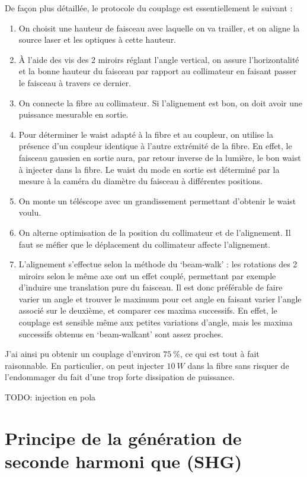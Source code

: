 \documentclass[11pt,a4paper] { article}
\begin{document}
De façon plus détaillée, le protocole du couplage est essentiellement le suivant :
\begin{enumerate}
	\item On choisit une hauteur de faisceau avec laquelle on va trailler, et on aligne la source laser et les optiques à cette hauteur.
	\item À l'aide des vis des 2 miroirs réglant l'angle vertical, on assure l'horizontalité et la bonne hauteur du faisceau par rapport au collimateur en faisant passer le faisceau à travers ce dernier.
	\item On connecte la fibre au collimateur. Si l'alignement est bon, on doit avoir une puissance mesurable en sortie.
	\item Pour déterminer le waist adapté à la fibre et au coupleur, on utilise la présence d'un coupleur identique à l'autre extrémité de la fibre. En effet, le faisceau gaussien en sortie aura, par retour inverse de la lumière, le bon waist à injecter dans la fibre. Le waist du mode en sortie est déterminé par la mesure à la caméra du diamètre du faisceau à différentes positions.	
	\item On monte un téléscope avec un grandissement permettant d'obtenir le waist voulu.
	\item On alterne optimisation de la position du collimateur et de l'alignement. Il faut se méfier que le déplacement du collimateur affecte l'alignement.
	\item L'alignement s'effectue selon la méthode du `beam-walk' : les rotations des 2 miroirs selon le même axe ont un effet couplé, permettant par exemple d'induire une translation pure du faisceau. Il est donc préférable de faire varier un angle et trouver le maximum pour cet angle en faisant varier l'angle associé sur le deuxième, et comparer ces maxima successifs. En effet, le couplage est sensible même aux petites variations d'angle, mais les maxima successifs obtenus en `beam-walkant' sont assez proches. 
\end{enumerate}

J'ai ainsi pu obtenir un couplage d'environ $\SI{75}{\percent}$, ce qui est tout à fait raisonnable. En particulier, on peut injecter $\SI{10}{W}$ dans la fibre sans risquer de l'endommager du fait d'une trop forte dissipation de puissance.

TODO: injection en pola


\section{Principe de la génération de seconde harmoni que (SHG)} %
\label{SHG}
\end{document}
